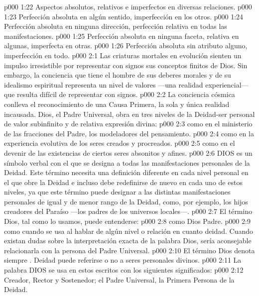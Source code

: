 \vs p000 1:22 Aspectos absolutos, relativos e imperfectos en diversas relaciones.
\vs p000 1:23 Perfección absoluta en algún sentido, imperfección en los otros.
\vs p000 1:24 Perfección absoluta en ninguna dirección, perfección relativa en todas las manifestaciones.
\vs p000 1:25 Perfección absoluta en ninguna faceta, relativa en algunas, imperfecta en otras.
\vs p000 1:26 Perfección absoluta sin atributo alguno, imperfección en todo.
\vs p000 2:1 Las criaturas mortales en evolución sienten un impulso irresistible por representar con signos sus conceptos finitos de Dios. Sin embargo, la conciencia que tiene el hombre de sus deberes morales y de su idealismo espiritual representa un nivel de valores ---una realidad experiencial--- que resulta difícil de representar con signos.
\vs p000 2:2 La conciencia cósmica conlleva el reconocimiento de una Causa Primera, la sola y única realidad incausada. Dios, el Padre Universal, obra en tres niveles de la Deidad\hyp{}ser personal de valor subinfinito y de relativa expresión divina:
\vs p000 2:3  como en el ministerio de las fracciones del Padre, los modeladores del pensamiento.
\vs p000 2:4  como en la experiencia evolutiva de los seres creados y procreados.
\vs p000 2:5  como en el devenir de las existencias de ciertos seres absonitos y afines.
\vs p000 2:6 DIOS es un símbolo verbal con el que se designa a todas las manifestaciones personales de la Deidad. Este término necesita una definición diferente en cada nivel personal en el que obre la Deidad e incluso debe redefinirse de nuevo en cada uno de estos niveles, ya que este término puede designar a las distintas manifestaciones personales de igual y de menor rango de la Deidad, como, por ejemplo, los hijos creadores del Paraíso ---los padres de los universos locales---.
\vs p000 2:7 \pc El término Dios, tal como lo usamos, puede entenderse:
\vs p000 2:8  como Dios Padre.
\vs p000 2:9  como cuando se usa al hablar de algún nivel o relación en cuanto deidad. Cuando existan dudas sobre la interpretación exacta de la palabra Dios, sería aconsejable relacionarla con la persona del Padre Universal.
\vs p000 2:10 \pc El término Dios denota siempre . Deidad puede referirse o no a seres personales divinos.
\vs p000 2:11 \pc La palabra DIOS se usa en estos escritos con los siguientes significados:
\vs p000 2:12  Creador, Rector y Sostenedor; el Padre Universal, la Primera Persona de la Deidad.
